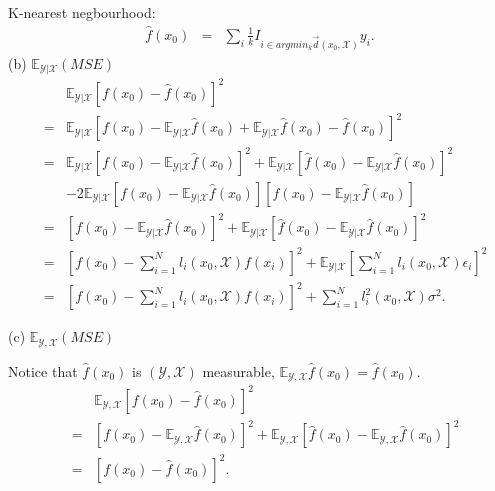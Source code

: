 K-nearest negbourhood:
\begin{eqnarray*}
\hat{f}(x_0)&=& \sum_{i} \frac{1}{k} I_{i\in argmin_{k}\overrightarrow{d}(x_0, \mathcal{X})} y_{i}.
\end{eqnarray*}
(b) $\mathbb{E}_{\mathcal{Y}|\mathcal{X}}(MSE)$
\begin{eqnarray*}
&& \mathbb{E}_{\mathcal{Y}|\mathcal{X}} \left[f(x_0) - \hat{f}(x_0)\right]^2\\
&=& \mathbb{E}_{\mathcal{Y}|\mathcal{X}} \left[f(x_0) -  \mathbb{E}_{\mathcal{Y}|\mathcal{X}} \hat{f}(x_0) + \mathbb{E}_{\mathcal{Y}|\mathcal{X}} \hat{f}(x_0)- \hat{f}(x_0)\right]^2 \\
&=& \mathbb{E}_{\mathcal{Y}|\mathcal{X}} \left[f(x_0) -  \mathbb{E}_{\mathcal{Y}|\mathcal{X}} \hat{f}(x_0)\right]^2 + \mathbb{E}_{\mathcal{Y}|\mathcal{X}}\left[\hat{f}(x_0) - \mathbb{E}_{\mathcal{Y}|\mathcal{X}} \hat{f}(x_0)\right]^2\\
&& - 2\mathbb{E}_{\mathcal{Y}|\mathcal{X}}\left[f(x_0) -  \mathbb{E}_{\mathcal{Y}|\mathcal{X}} \hat{f}(x_0)\right]\left[\hat{f}(x_0) - \mathbb{E}_{\mathcal{Y}|\mathcal{X}} \hat{f}(x_0)\right] \\
&=& \left[f(x_0) -  \mathbb{E}_{\mathcal{Y}|\mathcal{X}} \hat{f}(x_0)\right]^2  +  \mathbb{E}_{\mathcal{Y}|\mathcal{X}}\left[\hat{f}(x_0) - \mathbb{E}_{\mathcal{Y}|\mathcal{X}} \hat{f}(x_0)\right]^2 \\
&=& \left[f(x_0) - \sum_{i=1}^N l_{i}(x_0, \mathcal{X})f(x_i)\right]^2  +  \mathbb{E}_{\mathcal{Y}|\mathcal{X}}\left[\sum_{i=1}^N l_{i}(x_0, \mathcal{X})\epsilon_i\right]^2\\
&=& \left[f(x_0) - \sum_{i=1}^N l_{i}(x_0, \mathcal{X})f(x_i)\right]^2  +  \sum_{i=1}^N l_{i}^2(x_0, \mathcal{X})\sigma^2.
\end{eqnarray*}

(c) $\mathbb{E}_{\mathcal{Y}, \mathcal{X}}(MSE)$

Notice that $\hat{f}(x_0)$ is $(\mathcal{Y, X})$ measurable, $\mathbb{E}_{\mathcal{Y, X}}\hat{f}(x_0)=\hat{f}(x_0).$
\begin{eqnarray*}
&& \mathbb{E}_{\mathcal{Y},\mathcal{X}} \left[f(x_0) - \hat{f}(x_0)\right]^2\\
&=& \left[f(x_0) -  \mathbb{E}_{\mathcal{Y},\mathcal{X}} \hat{f}(x_0)\right]^2  +  \mathbb{E}_{\mathcal{Y},\mathcal{X}}\left[\hat{f}(x_0) - \mathbb{E}_{\mathcal{Y},\mathcal{X}} \hat{f}(x_0)\right]^2 \\
&=& \left[f(x_0) - \hat{f}(x_0)\right]^2.
\end{eqnarray*}

